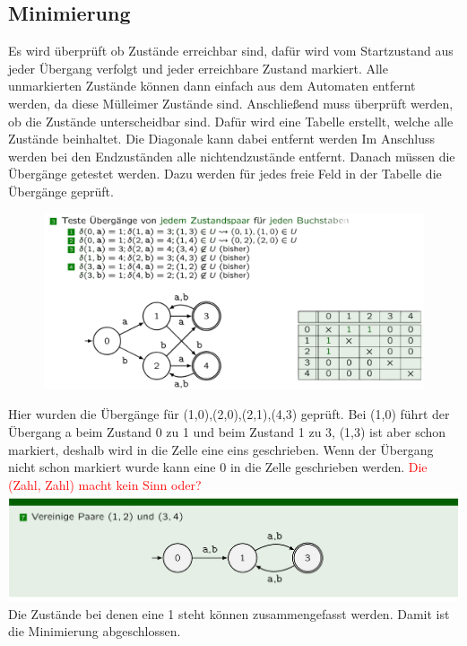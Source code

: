\documentclass[12pt,a4paper]{article}
\begin{document}
	\subsection{Minimierung}
	Es wird überprüft ob Zustände erreichbar sind, dafür wird vom Startzustand aus jeder Übergang verfolgt und jeder erreichbare Zustand markiert. Alle unmarkierten Zustände können dann einfach aus dem Automaten entfernt werden, da diese Mülleimer Zustände sind. Anschließend muss überprüft werden, ob die Zustände unterscheidbar sind.
	Dafür wird eine Tabelle erstellt, welche alle Zustände beinhaltet. Die Diagonale kann dabei entfernt werden Im Anschluss werden bei den Endzuständen alle nichtendzustände entfernt. Danach müssen die Übergänge getestet werden. Dazu werden für jedes freie Feld in der Tabelle die Übergänge geprüft.\newline
	\begin{center}
		\begin{figure}[!h]
			\includegraphics[width=\textwidth]{Bilder/MinimizingUbergangBsp.png}
		\end{figure}
	\end{center}
	Hier wurden die Übergänge für (1,0),(2,0),(2,1),(4,3) geprüft. Bei (1,0) führt der Übergang a beim Zustand 0 zu 1 und beim Zustand 1 zu 3, (1,3) ist aber schon markiert, deshalb wird in die Zelle eine eins geschrieben. Wenn der Übergang nicht schon markiert wurde kann eine 0 in die Zelle geschrieben werden. \textcolor{red}{Die (Zahl, Zahl) macht kein Sinn oder?}\newline
	\includegraphics[width=\textwidth]{Bilder/MinimizingVereinigung.png}
	Die Zustände bei denen eine 1 steht können zusammengefasst werden. Damit ist die Minimierung abgeschlossen.
\end{document}
